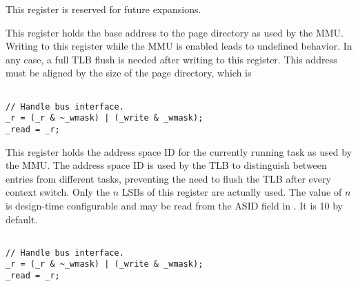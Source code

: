This register is reserved for future expansions.


This register holds the base address to the page directory as used by the MMU.
Writing to this register while the MMU is enabled leads to undefined behavior.
In any case, a full TLB flush is needed after writing to this register. This
address must be aligned by the size of the page directory, which is 

\declaration{}
\implementation{}
\begin{lstlisting}

// Handle bus interface.
_r = (_r & ~_wmask) | (_write & _wmask);
_read = _r;

\end{lstlisting}


This register holds the address space ID for the currently running task as used
by the MMU. The address space ID is used by the TLB to distinguish between
entries from different tasks, preventing the need to flush the TLB after every
context switch. Only the $n$ LSBs of this register are actually used. The value
of $n$ is design-time configurable and may be read from the ASID field in
. It is 10 by default.

\declaration{}
\implementation{}
\begin{lstlisting}

// Handle bus interface.
_r = (_r & ~_wmask) | (_write & _wmask);
_read = _r;

\end{lstlisting}


